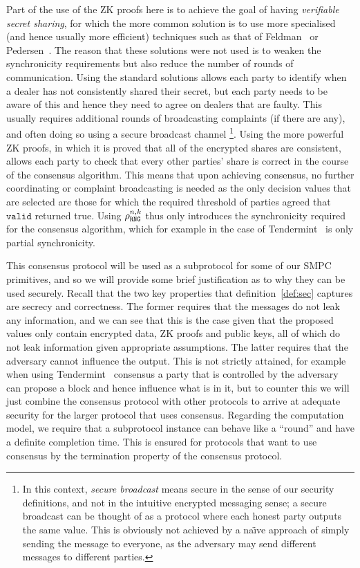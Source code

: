 \documentclass{article}
\theoremstyle{remark}
\begin{document}
Part of the use of the ZK proofs here is to achieve the goal of having
\textit{verifiable secret sharing}, for which the more common solution is to
use more specialised (and hence usually more efficient) techniques such as that
of Feldman~\cite{feldman_1987} or Pedersen~\cite{pedersen_1991}. The reason
that these solutions were not used is to weaken the synchronicity requirements
but also reduce the number of rounds of communication. Using the standard
solutions allows each party to identify when a dealer has not consistently
shared their secret, but each party needs to be aware of this and hence they
need to agree on dealers that are faulty. This usually requires additional
rounds of broadcasting complaints (if there are any), and often doing so using
a secure broadcast channel%
\footnote{%
	In this context, \textit{secure broadcast} means secure in the sense of our
	security definitions, and not in the intuitive encrypted messaging sense; a
	secure broadcast can be thought of as a protocol where each honest party
	outputs the same value. This is obviously not achieved by a na\"{\i}ve
	approach of simply sending the message to everyone, as the adversary may
	send different messages to different parties.
}.
Using the more powerful ZK proofs, in which it is proved that all of the
encrypted shares are consistent, allows each party to check that every other
parties' share is correct in the course of the consensus algorithm. This means
that upon achieving consensus, no further coordinating or complaint
broadcasting is needed as the only decision values that are selected are those
for which the required threshold of parties agreed that $\texttt{valid}$
returned true. Using $\rho_\texttt{RNG}^{n, k}$ thus only introduces the synchronicity
required for the consensus algorithm, which for example in the case of
Tendermint~\cite{buchman_2018} is only partial synchronicity.

This consensus protocol will be used as a subprotocol for some of our SMPC
primitives, and so we will provide some brief justification as to why they can
be used securely. Recall that the two key properties that
definition~\ref{def:sec} captures are secrecy and correctness. The former
requires that the messages do not leak any information, and we can see that
this is the case given that the proposed values only contain encrypted data, ZK
proofs and public keys, all of which do not leak information given appropriate
assumptions. The latter requires that the adversary cannot influence the
output. This is not strictly attained, for example when using
Tendermint~\cite{buchman_2018} consensus a party that is controlled by the
adversary can propose a block and hence influence what is in it, but to counter
this we will just combine the consensus protocol with other protocols to arrive
at adequate security for the larger protocol that uses consensus. Regarding the
computation model, we require that a subprotocol instance can behave like a
``round'' and have a definite completion time. This is ensured for protocols
that want to use consensus by the termination property of the consensus
protocol.
\end{document}
